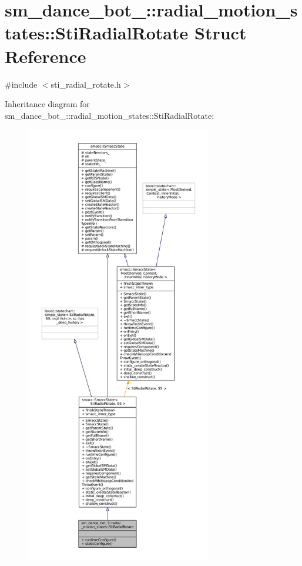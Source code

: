 \hypertarget{structsm__dance__bot__3_1_1radial__motion__states_1_1StiRadialRotate}{}\section{sm\+\_\+dance\+\_\+bot\+\_\+:\+:radial\+\_\+motion\+\_\+states\+:\+:Sti\+Radial\+Rotate Struct Reference}
\label{structsm__dance__bot__3_1_1radial__motion__states_1_1StiRadialRotate}


{\ttfamily \#include $<$sti\+\_\+radial\+\_\+rotate.\+h$>$}



Inheritance diagram for sm\+\_\+dance\+\_\+bot\+\_\+:\+:radial\+\_\+motion\+\_\+states\+:\+:Sti\+Radial\+Rotate\+:
\nopagebreak
\begin{figure}[H]
\begin{center}
\leavevmode
\includegraphics[height=550pt]{structsm__dance__bot__3_1_1radial__motion__states_1_1StiRadialRotate__inherit__graph}
\end{center}
\end{figure}


